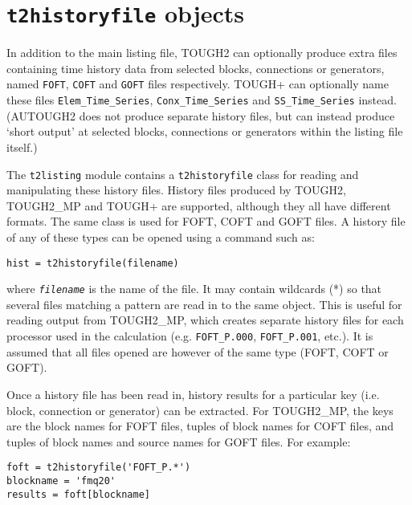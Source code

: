 \section{\texttt{t2historyfile} objects}

In addition to the main listing file, TOUGH2 can optionally produce extra files containing time history data from selected blocks, connections or generators, named \texttt{FOFT}, \texttt{COFT} and \texttt{GOFT} files respectively.  TOUGH+ can optionally name these files \texttt{Elem\_Time\_Series}, \texttt{Conx\_Time\_Series} and \texttt{SS\_Time\_Series} instead.  (AUTOUGH2 does not produce separate history files, but can instead produce `short output' at selected blocks, connections or generators within the listing file itself.)

The \texttt{t2listing} module contains a \texttt{t2historyfile} class for reading and manipulating these history files.  History files produced by TOUGH2, TOUGH2\_MP and TOUGH+ are supported, although they all have different formats.  The same class is used for FOFT, COFT and GOFT files.  A history file of any of these types can be opened using a command such as:

\begin{lstlisting}
hist = t2historyfile(filename)
\end{lstlisting}

where \texttt{\emph{filename}} is the name of the file.  It may contain wildcards (*) so that several files matching a pattern are read in to the same object.  This is useful for reading output from TOUGH2\_MP, which creates separate history files for each processor used in the calculation (e.g. \texttt{FOFT\_P.000}, \texttt{FOFT\_P.001}, etc.).  It is assumed that all files opened are however of the same type (FOFT, COFT or GOFT).

Once a history file has been read in, history results for a particular key (i.e. block, connection or generator) can be extracted.  For TOUGH2\_MP, the keys are the block names for FOFT files, tuples of block names for COFT files, and tuples of block names and source names for GOFT files.  For example:

\begin{lstlisting}
foft = t2historyfile('FOFT_P.*')
blockname = 'fmq20'
results = foft[blockname]
\end{lstlisting}


